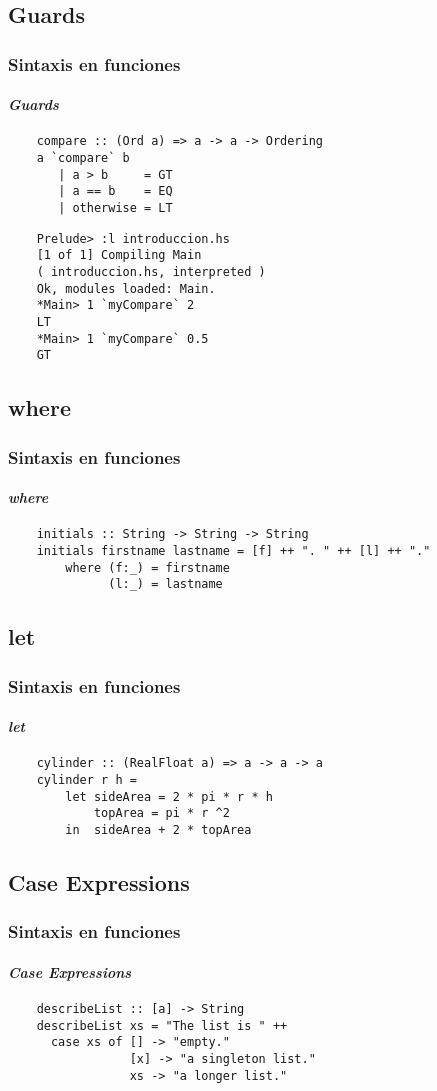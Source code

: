 \documentclass{beamer}
\begin{document}
\subsection{Guards}
\begin{frame}[fragile]
  \frametitle{Sintaxis en funciones}
  \framesubtitle{\emph{Guards}}
  \begin{verbatim}
    compare :: (Ord a) => a -> a -> Ordering
    a `compare` b
       | a > b     = GT
       | a == b    = EQ
       | otherwise = LT
  \end{verbatim}
  \begin{verbatim}
    Prelude> :l introduccion.hs
    [1 of 1] Compiling Main
    ( introduccion.hs, interpreted )
    Ok, modules loaded: Main.
    *Main> 1 `myCompare` 2
    LT
    *Main> 1 `myCompare` 0.5
    GT
  \end{verbatim}
\end{frame}

\subsection{where}
\begin{frame}[fragile]
  \frametitle{Sintaxis en funciones}
  \framesubtitle{\emph{where}}
  \begin{verbatim}
    initials :: String -> String -> String  
    initials firstname lastname = [f] ++ ". " ++ [l] ++ "."  
        where (f:_) = firstname  
              (l:_) = lastname    
  \end{verbatim}
\end{frame}
\subsection{let}
\begin{frame}[fragile]
  \frametitle{Sintaxis en funciones}
  \framesubtitle{\emph{let}}
  \begin{verbatim}
    cylinder :: (RealFloat a) => a -> a -> a  
    cylinder r h = 
        let sideArea = 2 * pi * r * h  
            topArea = pi * r ^2  
        in  sideArea + 2 * topArea  
  \end{verbatim}
\end{frame}
\subsection{Case Expressions}
\begin{frame}[fragile]
  \frametitle{Sintaxis en funciones}
  \framesubtitle{\emph{Case Expressions}}
  \begin{verbatim}
    describeList :: [a] -> String  
    describeList xs = "The list is " ++
      case xs of [] -> "empty."  
                 [x] -> "a singleton list."   
                 xs -> "a longer list."  
  \end{verbatim}
\end{frame}
\end{document}
